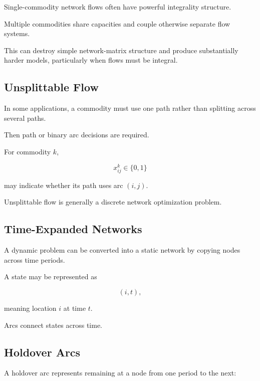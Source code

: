 Single-commodity network flows often have powerful integrality structure.

Multiple commodities share capacities and couple otherwise separate flow
systems.

This can destroy simple network-matrix structure and produce substantially
harder models, particularly when flows must be integral.

\subsection{Unsplittable Flow}
\label{subsec:unsplittable-flow}

In some applications, a commodity must use one path rather than splitting
across several paths.

Then path or binary arc decisions are required.

For commodity \(k\),

\[
\boxed{
x_{ij}^{k}\in\{0,1\}
}
\]

may indicate whether its path uses arc \((i,j)\).

Unsplittable flow is generally a discrete network optimization problem.

\subsection{Time-Expanded Networks}
\label{subsec:time-expanded-networks}

A dynamic problem can be converted into a static network by copying nodes
across time periods.

A state may be represented as

\[
\boxed{
(i,t),
}
\]

meaning location \(i\) at time \(t\).

Arcs connect states across time.

\subsection{Holdover Arcs}
\label{subsec:holdover-arcs}

A holdover arc represents remaining at a node from one period to the next:

